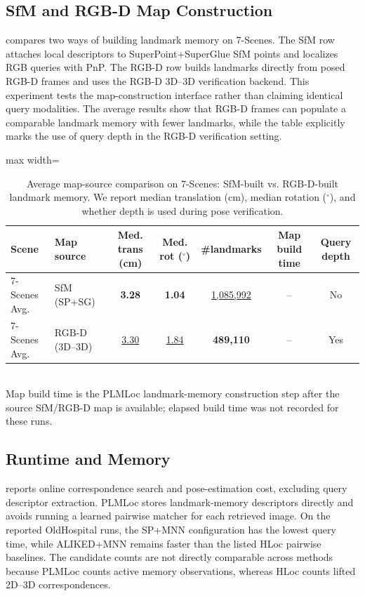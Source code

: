 \documentclass[letterpaper,10 pt,conference]{ieeeconf}
\newcommand{\method}{PLMLoc}
\begin{document}
\subsection{SfM and RGB-D Map Construction}

 compares two ways of building landmark memory on 7-Scenes. The SfM row attaches local descriptors to SuperPoint+SuperGlue SfM points and localizes RGB queries with PnP. The RGB-D row builds landmarks directly from posed RGB-D frames and uses the RGB-D 3D--3D verification backend. This experiment tests the map-construction interface rather than claiming identical query modalities. The average results show that RGB-D frames can populate a comparable landmark memory with fewer landmarks, while the table explicitly marks the use of query depth in the RGB-D verification setting.


\begin{table}[!t]
    \centering
    \caption{Average map-source comparison on 7-Scenes: SfM-built vs. RGB-D-built landmark memory. We report median translation (cm), median rotation ($^\circ$), and whether depth is used during pose verification.}
    \label{tab:rgbd-vs-sfm}
    \setlength{\tabcolsep}{4pt}
    \begin{adjustbox}{max width=\textwidth}
    \begin{tabular}{@{}llccccc@{}}
        \toprule
        Scene & Map source & Med. trans (cm) & Med. rot ($^\circ$) & \#landmarks & Map build time & Query depth \\
        \midrule
        7-Scenes Avg. & SfM (SP+SG) & \textbf{3.28} & \textbf{1.04} & \underline{1{,}085{,}992} & -- & No \\
        7-Scenes Avg. & RGB-D (3D--3D) & \underline{3.30} & \underline{1.84} & \textbf{489{,}110} & -- & Yes \\
        \bottomrule
    \end{tabular}
    \end{adjustbox}
    \\[2pt]
    {Map build time is the \method{} landmark-memory construction step after the source SfM/RGB-D map is available; elapsed build time was not recorded for these runs.}
\end{table}

\subsection{Runtime and Memory}

 reports online correspondence search and pose-estimation cost, excluding query descriptor extraction. \method{} stores landmark-memory descriptors directly and avoids running a learned pairwise matcher for each retrieved image. On the reported OldHospital runs, the SP+MNN configuration has the lowest query time, while ALIKED+MNN remains faster than the listed HLoc pairwise baselines. The candidate counts are not directly comparable across methods because \method{} counts active memory observations, whereas HLoc counts lifted 2D--3D correspondences.
\end{document}
